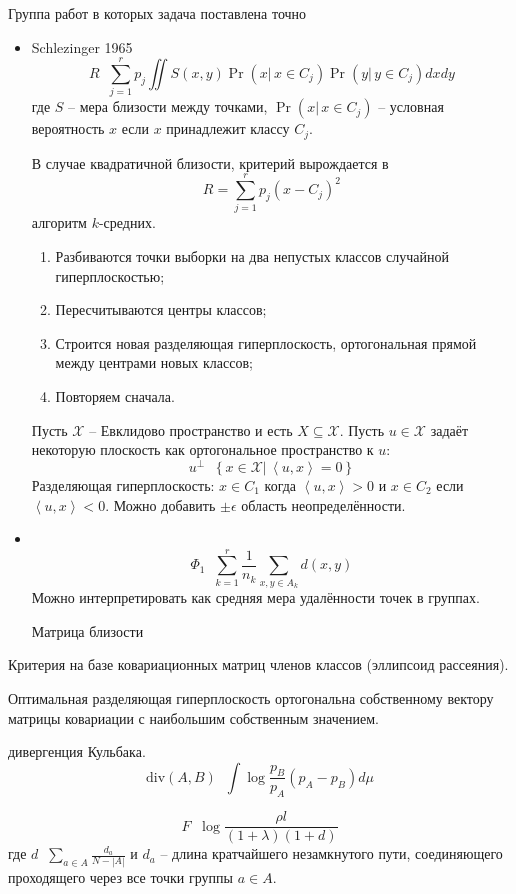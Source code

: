 \documentclass[a4paper]{article}
\newcommand{\obj}[1]{{\left\{ #1 \right \}}}
\newcommand{\brac}[1]{{\left ( #1 \right )}}
\newcommand{\induc}[1]{{\left . #1 \right \vert}}
\newcommand{\abs}[1]{{\left | #1 \right |}}
\newcommand{\brkt}[1]{{\left\langle #1 \right\rangle}}
\newcommand{\defn}{\mathop{\overset{\Delta}{=}}\nolimits}
\begin{document}
Группа работ в которых задача поставлена точно
\begin{itemize}
	\item Schlezinger 1965
	\[R \defn \sum_{j=1}^r p_j \iint S(x,y) \Pr\brac{\induc{x}\,x\in C_j}\Pr\brac{\induc{y}\,y\in C_j} dxdy\]
	где $S$ -- мера близости между точками, $\Pr\brac{\induc{x}\,x\in C_j}$ -- условная вероятность $x$ если $x$ принадлежит классу $C_j$.

	В случае квадратичной близости, критерий вырождается в \[R = \sum_{j=1}^r p_j \brac{x-C_j}^2\] алгоритм $k$-средних.

	\begin{enumerate}
		\item Разбиваются точки выборки на два непустых классов случайной гиперплоскостью; 
		\item Пересчитываются центры классов;
		\item Строится новая разделяющая гиперплоскость, ортогональная прямой между центрами новых классов;
		\item Повторяем сначала.
	\end{enumerate}

	Пусть $\mathcal{X}$ -- Евклидово пространство и есть $X\subseteq \mathcal{X}$.
	Пусть $u\in \mathcal{X}$ задаёт некоторую плоскость как ортогональное пространство к $u$:
	\[u^\perp \defn \obj{\induc{x\in \mathcal{X}}\, \brkt{u,x} = 0}\]
	Разделяющая гиперплоскость: $x\in C_1$ когда $\brkt{u,x}>0$ и $x\in C_2$ если $\brkt{u,x}<0$.
	Можно добавить $\pm\epsilon$ область неопределённости.

	\item \hfill \\
	\[\Phi_1 \defn \sum_{k=1}^r \frac{1}{n_k} \sum_{x,y\in A_k} d(x,y)\]
	Можно интерпретировать как средняя мера удалённости точек в группах.


	Матрица близости

\end{itemize}

Критерия на базе ковариационных матриц членов классов (эллипсоид рассеяния).

Оптимальная разделяющая гиперплоскость ортогональна собственному вектору матрицы ковариации с наибольшим собственным значением.

дивергенция Кульбака.
\[\text{div}(A,B) \defn \int \log\frac{p_B}{p_A} \brac{p_A-p_B} d\mu\]


\[F\defn \log\frac{\rho l}{\brac{1+\lambda}\brac{1+d}}\]
где $d\defn \sum_{a\in A} \frac{d_a}{N-\abs{A}}$ и $d_a$ -- длина кратчайшего незамкнутого пути, соединяющего проходящего через все точки группы $a\in A$.
\end{document}

